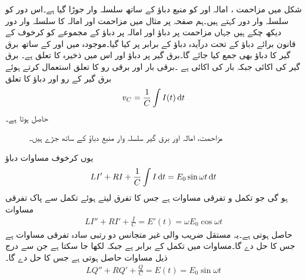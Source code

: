 شکل  میں  مزاحمت ، امالہ  اور    کو منبع دباؤ کے ساتھ سلسلہ وار جوڑا گیا ہے۔اس دور کو سلسلہ وار  دور کہتے ہیں۔ہم صفحہ  پر مثال  میں مزاحمت اور امالہ کا سلسلہ وار  دور دیکھ چکے ہیں جہاں مزاحمت پر دباؤ  اور امالہ پر دباؤ  کے مجموعے کو کرخوف کے قانون برائے دباؤ کے تحت درآیدہ دباؤ  کے برابر پر کیا گیا۔موجودہ  میں  اور  کے ساتھ برق گیر کا دباؤ  بھی جمع کیا جائے گا۔برق گیر پر دباؤ  اور اس میں ذخیرہ   کا تعلق  ہے۔ برق گیر کی اکائی   جبکہ بار کی اکائی   ہے ۔برقی بار اور برقی رو کا تعلق  استعمال کرتے ہوئے برق گیر کے رو اور دباؤ کا تعلق 
\begin{align}
v_C=\frac{1}{C}\int I(t) \dif t
\end{align}
حاصل ہوتا ہے۔
\begin{figure}
\centering
{}
\caption{مزاحمت، امالہ اور برق گیر سلسلہ وار منبع دباؤ کے ساتھ جڑے ہیں۔}
\label{شکل_سادہ_دو_سلسلہ_وار_دور_الف}
\end{figure}

یوں کرخوف مساوات دباؤ
\begin{align}\label{مساوات_سادہ_دو_سلسلہ_وار_الف}
LI'+RI+\frac{1}{C}\int I\dif t=E_0\sin \omega t\dif t
\end{align}
ہو گی جو تکمل و تفرقی مساوات ہے جس کا تفرق لیتے ہوئے تکمل سے پاک تفرقی مساوات
\begin{align}\label{مساوات_سادہ_دو_سلسلہ_وار_ب}
LI''+RI'+\frac{I}{C}=E'(t)=\omega E_0\cos \omega t
\end{align}
 حاصل ہوتی ہے۔یہ مستقل  ضریب  والی غیر متجانس دو رتبی سادہ تفرقی مساوات ہے جس کا حل  دے گا۔مساوات  میں تکمل  کے برابر ہے جبکہ   لکھا جا سکتا ہے جن سے درج ذیل مساوات حاصل ہوتی ہے جس کا حل  دے گا۔
\begin{align}\label{مساوات_سادہ_دو_سلسلہ_وار_پ}
LQ''+RQ'+\frac{Q}{C}=E(t)=E_0\sin \omega t
\end{align}

